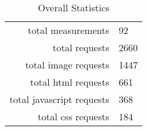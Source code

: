 \begin{table}[h]
\caption{Overall Statistics}\centering
\begin{tabular}{rl}
total measurements & 92\\
total requests & 2660\\
total image requests & 1447\\
total html requests & 661\\
total javascript requests & 368\\
total css requests & 184\\
\end{tabular}
\end{table}
